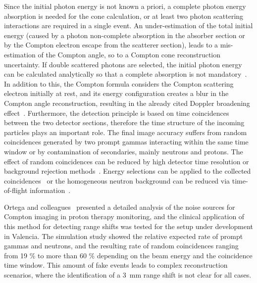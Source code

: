 Since the initial photon energy is not known a priori, a complete photon energy absorption is needed for the cone calculation, or at least two photon scattering interactions are required in a single event. An under-estimation of the total initial energy (caused by a photon non-complete absorption in the absorber section or by the Compton electron escape from the scatterer section), leads to a mis-estimation of the Compton angle, so to a Compton cone reconstruction uncertainty. If double scattered photons are selected, the initial photon energy can be calculated analytically so that a complete absorption is not mandatory~\parencite{Kurfess2000}. In addition to this, the Compton formula considers the Compton scattering electron initially at rest, and its energy configuration creates a blur in the Compton angle reconstruction, resulting in the already cited Doppler broadening effect~\parencite{Ordonez1997}. Furthermore, the detection principle is based on time coincidences between the two detector sections, therefore the time structure of the incoming particles plays an important role. The final image accuracy suffers from random coincidences generated by two prompt gammas interacting within the same time window or by contamination of secondaries, mainly neutrons and protons. The effect of random coincidences can be reduced by high detector time resolution or background rejection methods~\parencite{Draeger2017}. Energy selections can be applied to the collected coincidences~\parencite{Polf2009, Hilaire2016} or the homogeneous neutron background can be reduced via time-of-flight information~\parencite{Testa2010}.

Ortega and colleagues~\parencite{Ortega2015} presented a detailed analysis of the noise sources for Compton imaging in proton therapy monitoring, and the clinical application of this method for detecting range shifts was tested for the setup under development in Valencia. The simulation study showed the relative expected rate of prompt gammas and neutrons, and the resulting rate of random coincidences ranging from 19 \% to more than 60 \% depending on the beam energy and the coincidence time window. This amount of fake events leads to complex reconstruction scenarios, where the identification of a 3~mm range shift is not clear for all cases.

